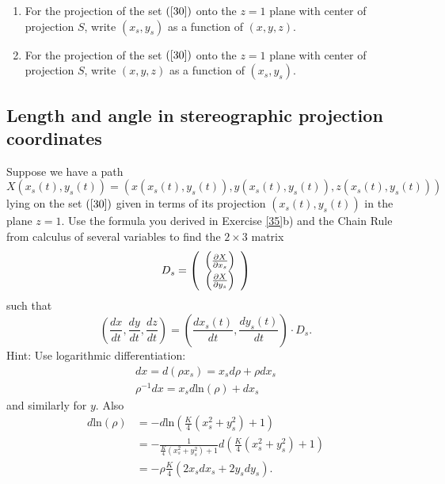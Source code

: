 \begin{exercise}\label{35}\hfil
\begin{enumerate}
\item For the projection of the set $\left(  \ref{30}\right)  $ onto
the $z=1$ plane with center of projection $S$, write $\left(  x_{s}%
,y_{s}\right)  $ as a function of $\left(  x,y,z\right)  $.
\item For the projection of the set $\left(  \ref{30}\right)  $ onto the $z=1$
plane with center of projection $S$, write $\left(  x,y,z\right)  $ as a
function of $\left(  x_{s},y_{s}\right)  $.
\end{enumerate}
\end{exercise}

\subsection*{Length and angle in stereographic projection coordinates}

\begin{exercise}
\label{37}Suppose we have a path%
\[
X\left(  x_{s}\left(  t\right)  ,y_{s}\left(  t\right)  \right)  =\left(
x\left(  x_{s}\left(  t\right)  ,y_{s}\left(  t\right)  \right)  ,y\left(
x_{s}\left(  t\right)  ,y_{s}\left(  t\right)  \right)  ,z\left(  x_{s}\left(
t\right)  ,y_{s}\left(  t\right)  \right)  \right)
\]
lying on the set $\left(  \ref{30}\right)  $ given in terms of its projection
$\left(  x_{s}\left(  t\right)  ,y_{s}\left(  t\right)  \right)  $ in the
plane $z=1$. Use the formula you derived in Exercise \ref{35}b) and the Chain
Rule from calculus of several variables to find the $2\times3$ matrix%
\[
D_{s}=\left(
\begin{array}
[c]{c}%
\left(  \frac{\partial X}{\partial x_{s}}\right) \\
\left(  \frac{\partial X}{\partial y_{s}}\right)
\end{array}
\right)
\]
such that%
\[
\left(  \frac{dx}{dt},\frac{dy}{dt},\frac{dz}{dt}\right)  =\left(
\frac{dx_{s}\left(  t\right)  }{dt},\frac{dy_{s}\left(  t\right)  }%
{dt}\right)  \cdot D_{s}.
\]
Hint: Use logarithmic differentiation:%
\begin{gather*}
dx=d\left(  \rho x_{s}\right)  =x_{s}d\rho+\rho dx_{s}\\
\rho^{-1}dx=x_{s}d\mathrm{ln}\left(  \rho\right)  +dx_{s}%
\end{gather*}
and similarly for $y$. Also%
\begin{align*}
d\mathrm{ln}\left(  \rho\right)   &  =-d\mathrm{ln}\left(  \frac{K}{4}\left(
x_{s}^{2}+y_{s}^{2}\right)  +1\right) \\
&  =-\frac{1}{\frac{K}{4}\left(  x_{s}^{2}+y_{s}^{2}\right)  +1}d\left(
\frac{K}{4}\left(  x_{s}^{2}+y_{s}^{2}\right)  +1\right) \\
&  =-\rho\frac{K}{4}\left(  2x_{s}dx_{s}+2y_{s}dy_{s}\right)  .
\end{align*}

\end{exercise}


